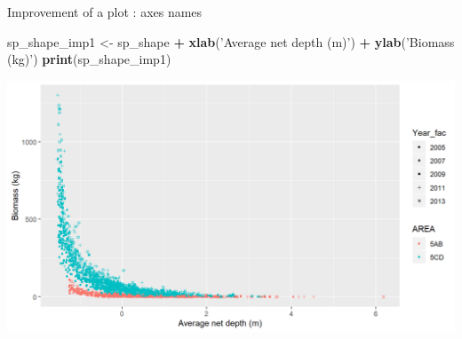 \documentclass[
  ignorenonframetext,
]{beamer}
\newenvironment{Shaded}{\begin{snugshade}}{\end{snugshade}}
\newcommand{\KeywordTok}[1]{\textcolor[rgb]{0.13,0.29,0.53}{\textbf{#1}}}
\newcommand{\NormalTok}[1]{#1}
\newcommand{\OperatorTok}[1]{\textcolor[rgb]{0.81,0.36,0.00}{\textbf{#1}}}
\newcommand{\StringTok}[1]{\textcolor[rgb]{0.31,0.60,0.02}{#1}}
\begin{document}
\begin{frame}[fragile]{Improvement of a plot : axes names}
\protect\hypertarget{improvement-of-a-plot-axes-names}{}

\begin{Shaded}
\begin{Highlighting}[]
\NormalTok{sp_shape_imp1 <-}\StringTok{ }\NormalTok{sp_shape }\OperatorTok{+}\StringTok{ }
\StringTok{  }\KeywordTok{xlab}\NormalTok{(}\StringTok{'Average net depth (m)'}\NormalTok{) }\OperatorTok{+}
\StringTok{  }\KeywordTok{ylab}\NormalTok{(}\StringTok{'Biomass (kg)'}\NormalTok{)}
\KeywordTok{print}\NormalTok{(sp_shape_imp1)}
\end{Highlighting}
\end{Shaded}

\begin{center}\includegraphics[width=0.8\linewidth]{figure/sp_shape_imp1-1} \end{center}

\end{frame}
\end{document}
